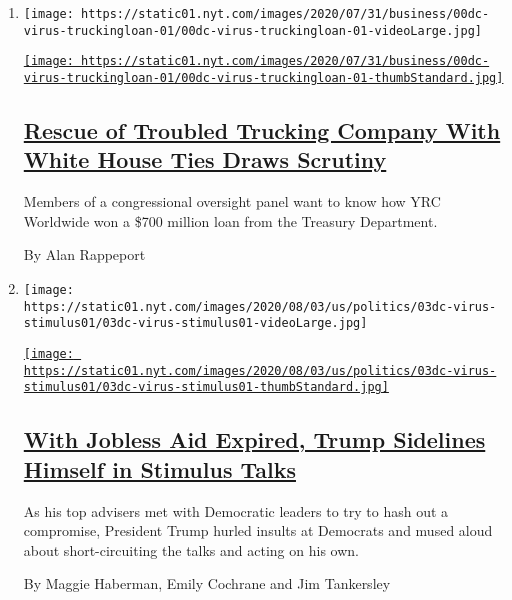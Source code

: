 \begin{enumerate}
\def\labelenumi{\arabic{enumi}.}
\item
  \texttt{[image: https://static01.nyt.com/images/2020/07/31/business/00dc-virus-truckingloan-01/00dc-virus-truckingloan-01-videoLarge.jpg]}

  \href{/2020/08/03/us/politics/yrc-coronavirus-relief-funds.html}{\texttt{[image: https://static01.nyt.com/images/2020/07/31/business/00dc-virus-truckingloan-01/00dc-virus-truckingloan-01-thumbStandard.jpg]}}

  \hypertarget{rescue-of-troubled-trucking-company-with-white-house-ties-draws-scrutiny}{%
  \subsection{\texorpdfstring{\href{/2020/08/03/us/politics/yrc-coronavirus-relief-funds.html}{Rescue
  of Troubled Trucking Company With White House Ties Draws
  Scrutiny}}{Rescue of Troubled Trucking Company With White House Ties Draws Scrutiny}}\label{rescue-of-troubled-trucking-company-with-white-house-ties-draws-scrutiny}}

  Members of a congressional oversight panel want to know how YRC
  Worldwide won a \$700 million loan from the Treasury Department.

  By Alan Rappeport
\item
  \texttt{[image: https://static01.nyt.com/images/2020/08/03/us/politics/03dc-virus-stimulus01/03dc-virus-stimulus01-videoLarge.jpg]}

  \href{/2020/08/03/us/politics/congress-jobless-aid-talks-trump.html}{\texttt{[image: https://static01.nyt.com/images/2020/08/03/us/politics/03dc-virus-stimulus01/03dc-virus-stimulus01-thumbStandard.jpg]}}

  \hypertarget{with-jobless-aid-expired-trump-sidelines-himself-in-stimulus-talks}{%
  \subsection{\texorpdfstring{\href{/2020/08/03/us/politics/congress-jobless-aid-talks-trump.html}{With
  Jobless Aid Expired, Trump Sidelines Himself in Stimulus
  Talks}}{With Jobless Aid Expired, Trump Sidelines Himself in Stimulus Talks}}\label{with-jobless-aid-expired-trump-sidelines-himself-in-stimulus-talks}}

  As his top advisers met with Democratic leaders to try to hash out a
  compromise, President Trump hurled insults at Democrats and mused
  aloud about short-circuiting the talks and acting on his own.

  By Maggie Haberman, Emily Cochrane and Jim Tankersley
\end{enumerate}

